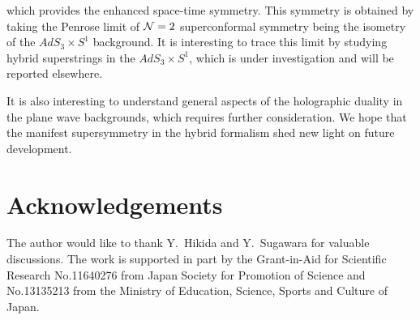 \documentclass[a4paper,seceq,preprint]{ptptex}
\begin{document}
which provides the enhanced space-time symmetry. 
This symmetry is obtained by taking the Penrose limit of 
${\cal N}=2$ superconformal symmetry being the isometry of the
$AdS_3\times S^1$ background.\cite{HS2}
It is interesting to trace this limit by studying
hybrid superstrings in the $AdS_3\times S^1$,
which is under investigation and will be reported elsewhere.\cite{K}

It is also interesting to understand general aspects of 
the holographic duality in the plane wave backgrounds,\cite{HS2,KP} 
which requires further consideration. We hope that the manifest 
supersymmetry in the hybrid formalism shed new light on 
future development.

\section*{Acknowledgements}
The author would like to thank Y.~Hikida and Y.~Sugawara
for valuable discussions. The work is supported in part by 
the Grant-in-Aid for Scientific Research No.11640276
from Japan Society for Promotion of Science and
No.13135213 from the Ministry of Education, Science, 
Sports and Culture of Japan.
\end{document}
